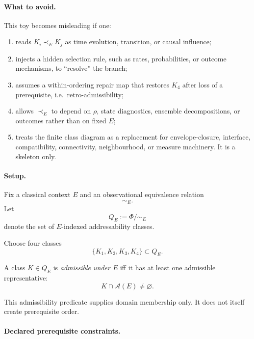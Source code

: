 \documentclass[aps,prx,onecolumn,11pt]{revtex4-2}
\theoremstyle{plain}
\theoremstyle{definition}
\theoremstyle{remark}
\begin{document}
\paragraph{What to avoid.}

This toy becomes misleading if one:

\begin{enumerate}[label=(\roman*), leftmargin=2.2em]

\item reads \(K_i\prec_E K_j\) as time evolution, transition, or causal
influence;

\item injects a hidden selection rule, such as rates, probabilities, or
outcome mechanisms, to ``resolve'' the branch;

\item assumes a within-ordering repair map that restores \(K_4\) after
loss of a prerequisite, i.e.\ retro-admissibility;

\item allows \(\prec_E\) to depend on \(\rho\), state diagnostics,
ensemble decompositions, or outcomes rather than on fixed \(E\);

\item treats the finite class diagram as a replacement for
envelope-closure, interface, compatibility, connectivity,
neighbourhood, or measure machinery. It is a skeleton only.

\end{enumerate}

\paragraph{Setup.}

Fix a classical context \(E\) and an observational equivalence relation
\[
\sim_E.
\]
Let
\[
Q_E:=\Phi/{\sim_E}
\]
denote the set of \(E\)-indexed addressability classes.

Choose four classes
\[
\{K_1,K_2,K_3,K_4\}\subset Q_E.
\]

A class \(K\in Q_E\) is \emph{admissible under \(E\)} iff it has at
least one admissible representative:
\[
K\cap\mathcal A(E)\neq\varnothing.
\]

This admissibility predicate supplies domain membership only. It does
not itself create prerequisite order.

\paragraph{Declared prerequisite constraints.}
\end{document}

